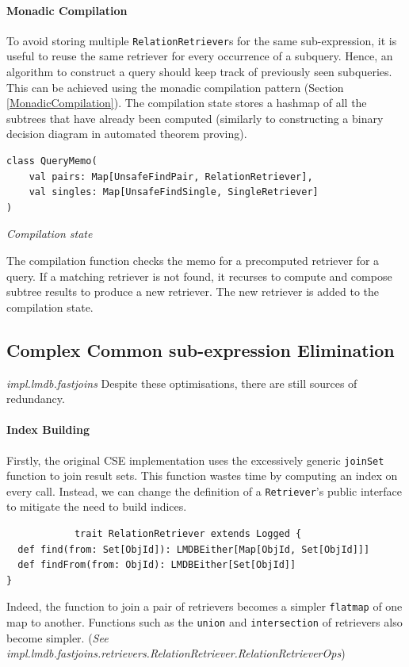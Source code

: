 \documentclass[12pt,a4paper,twoside,openright]{report}
\newcommand\codeName[1]{\texttt{#1}}
\newcommand\note[1]{\textit{#1}}
\renewcommand{\baselinestretch}{1.1}    %
\let\oldparagraph\paragraph
\renewcommand{\paragraph}[1]{\oldparagraph{#1}\mbox{}}
\begin{document}
		
		\paragraph{Monadic Compilation}
		To avoid storing multiple \codeName{RelationRetriever}s for the same sub-expression, it is useful to reuse the same retriever for every occurrence of a subquery. Hence, an algorithm to construct a query should keep track of previously seen subqueries. This can be achieved using the monadic compilation pattern (Section \ref{MonadicCompilation}). The compilation state stores a hashmap of all the subtrees that have already been computed (similarly to constructing a binary decision diagram in automated theorem proving). 
		
\renewcommand{\baselinestretch}{0.8}
\begin{framed}
\begin{verbatim}
class QueryMemo(
    val pairs: Map[UnsafeFindPair, RelationRetriever], 
    val singles: Map[UnsafeFindSingle, SingleRetriever]
)
\end{verbatim}
\note{Compilation state}
\end{framed}
\renewcommand{\baselinestretch}{1.1}

		The compilation function checks the memo for a precomputed retriever for a query. If a matching retriever is not found, it recurses to compute and compose subtree results to produce a new retriever. The new retriever is added to the compilation state.
		
	\subsection{Complex Common sub-expression Elimination}
	\note{impl.lmdb.fastjoins}
Despite these optimisations, there are still sources of redundancy.

		\paragraph{Index Building}
			Firstly, the original CSE implementation uses the excessively generic \codeName{joinSet} function to join result sets. This function wastes time by computing an index on every call. Instead, we can change the definition of a \codeName{Retriever}'s public interface to mitigate the need to build indices.
			\renewcommand{\baselinestretch}{0.8}
			\begin{framed}
			\begin{verbatim}
			trait RelationRetriever extends Logged {
  def find(from: Set[ObjId]): LMDBEither[Map[ObjId, Set[ObjId]]]
  def findFrom(from: ObjId): LMDBEither[Set[ObjId]]
}
			\end{verbatim}
			\end{framed}
			\renewcommand{\baselinestretch}{1.1}
			Indeed, the function to join a pair of retrievers becomes a simpler \codeName{flatmap} of one map to another. Functions such as the \codeName{union} and \codeName{intersection} of retrievers also become simpler. (\note{See impl.lmdb.fastjoins.retrievers.RelationRetriever.RelationRetrieverOps})
\end{document}
